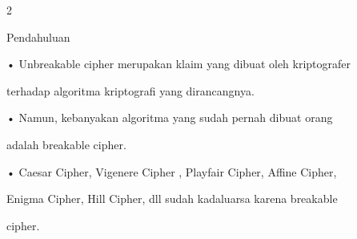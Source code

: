 \documentclass{article}
\begin{document}

2

Pendahuluan

• Unbreakable cipher merupakan klaim yang dibuat oleh kriptografer 

terhadap algoritma kriptografi yang dirancangnya.

• Namun, kebanyakan algoritma yang sudah pernah dibuat orang 

adalah breakable cipher.

• Caesar Cipher, Vigenere  Cipher , Playfair Cipher, Affine Cipher, 

Enigma Cipher, Hill Cipher, dll sudah kadaluarsa karena breakable 

cipher.
\end{document}
